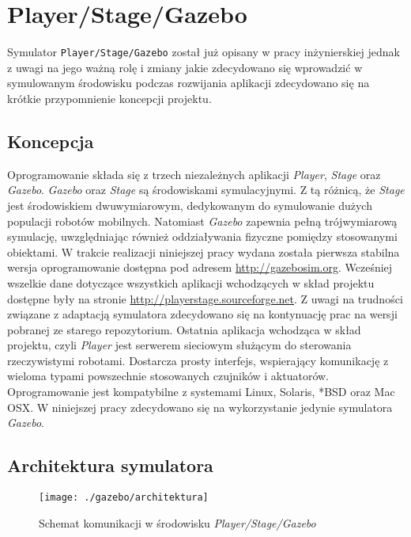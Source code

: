 \chapter[Player/Stage/Gazebo ]{Player/Stage/Gazebo \label{chap:gazebo}}
	Symulator \mbox{\texttt{Player/Stage/Gazebo}} został już opisany w pracy inżynierskiej \cite{inzynierka} jednak z uwagi na jego ważną rolę i zmiany jakie zdecydowano się wprowadzić w symulowanym
	środowisku podczas rozwijania aplikacji zdecydowano się na krótkie przypomnienie koncepcji projektu.

	\section{Koncepcja}
	Oprogramowanie składa się z trzech niezależnych aplikacji \textit{Player}, \textit{Stage} oraz \textit{Gazebo}.
	\textit{Gazebo} oraz \textit{Stage} są środowiskami symulacyjnymi. Z tą różnicą, że \textit{Stage} jest środowiskiem dwuwymiarowym, dedykowanym do symulowanie dużych populacji robotów
	mobilnych. Natomiast \textit{Gazebo} zapewnia pełną trójwymiarową symulację, uwzględniając również oddziaływania fizyczne pomiędzy stosowanymi obiektami.
	W trakcie realizacji niniejszej pracy wydana została pierwsza stabilna wersja oprogramowanie dostępna pod adresem \url{http://gazebosim.org}.
	Wcześniej wszelkie dane dotyczące wszystkich aplikacji wchodzących w skład projektu dostępne były na stronie \url{http://playerstage.sourceforge.net}. Z uwagi na trudności związane z adaptacją
	symulatora zdecydowano się na kontynuację prac na wersji pobranej ze starego repozytorium.
	Ostatnia aplikacja wchodząca w skład projektu, czyli \textit{Player} jest serwerem sieciowym służącym do sterowania rzeczywistymi robotami. Dostarcza prosty interfejs, wspierający komunikację z wieloma 
	typami powszechnie stosowanych czujników i aktuatorów.
	Oprogramowanie jest kompatybilne z systemami Linux, Solaris, *BSD oraz Mac OSX.
	W niniejszej pracy zdecydowano się na wykorzystanie jedynie symulatora \textit{Gazebo}.

	\section{Architektura symulatora}
	\begin{figure}[!b]
	\centering
	\texttt{[image: ./gazebo/architektura]}
	\caption{Schemat komunikacji w środowisku \textit{Player/Stage/Gazebo} \label{fig:arch}}
	\end{figure}
	
